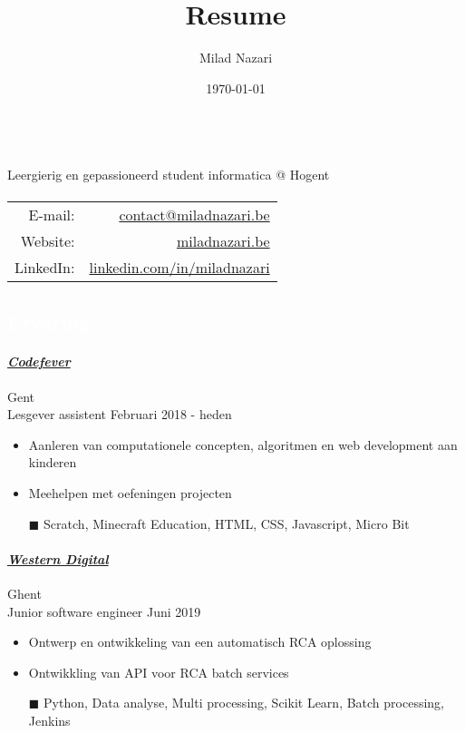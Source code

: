\documentclass[a4paper, twoside]{article}
\title{Resume}
\author{ Milad Nazari }
\date{\today}
\begin{document}
\begin{multicols}{2}
\\
\noindent Leergierig en gepassioneerd student informatica @ Hogent
\paragraph{}
{\small
\hfill
\begin{tabular}{rr}
\textcolor{blueDark}{E-mail:} & \href{ mailto:contact@miladnazari.be }{ contact@miladnazari.be } \\
\textcolor{blueDark}{Website:} & \href{ https://miladnazari.be }{ miladnazari.be } \\
\textcolor{blueDark}{LinkedIn}: & \href{ https://linkedin.com/in/miladnazari }{ linkedin.com/in/miladnazari }
\end{tabular}
}
\end{multicols}
\begin{mdframed}
\section*{\textcolor{white}{ Ervaring }}
\end{mdframed}
\paragraph{\textbf{\textit{\href{https://codefever.be }{\textcolor{blueDark}{ Codefever }}}}} \hfill\small Gent \\
Lesgever assistent \hfill\small
Februari 2018
- heden
\begin{itemize}
\itemsep-0.2em
\item Aanleren van computationele concepten, algoritmen en web development aan kinderen
\item Meehelpen met oefeningen projecten
\item[\color{orange}$\blacksquare$] Scratch, Minecraft Education, HTML, CSS, Javascript, Micro Bit
\end{itemize}
\paragraph{\textbf{\textit{\href{https://westerndigital.com }{\textcolor{blueDark}{ Western Digital }}}}} \hfill\small Ghent \\
Junior software engineer \hfill\small
Juni 2019
\begin{itemize}
\itemsep-0.2em
\item Ontwerp en ontwikkeling van een automatisch RCA oplossing
\item Ontwikkling van API voor RCA batch services
\item[\color{orange}$\blacksquare$] Python, Data analyse, Multi processing, Scikit Learn, Batch processing, Jenkins
\end{itemize}
\end{document}
